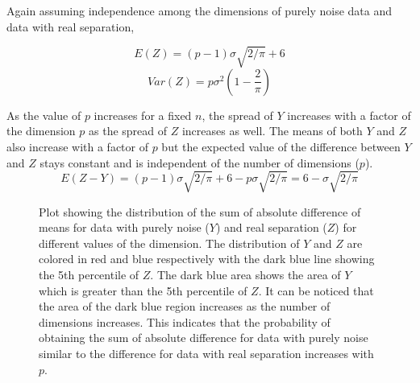 \documentclass[12]{article}
\begin{document}
Again assuming independence among the dimensions of purely noise data and data with real separation,

$$E(Z) = (p - 1) \sigma \sqrt{2/\pi} + 6$$
$$Var(Z) = p \sigma^2 (1 - \frac{2}{\pi})$$

As the value of $p$ increases for a fixed $n$, the spread of $Y$ increases with a factor of the dimension $p$ as the spread of $Z$ increases as well. The means of both $Y$ and $Z$ also increase with a factor of $p$ but the expected value of the difference between $Y$ and $Z$ stays constant and is independent of the number of dimensions ($p$). 
$$E (Z - Y) = (p - 1) \sigma \sqrt{2/\pi} + 6 - p \sigma \sqrt{2/\pi} = 6 - \sigma \sqrt{2/\pi}$$


%
\begin{figure}[hbtp]
   \centering
       \caption{Plot showing the distribution of the sum of absolute difference of means for data with purely noise ($Y$) and real separation ($Z$) for different values of the dimension. The distribution of $Y$ and $Z$ are colored in red and blue respectively with the dark blue line showing the 5th percentile of $Z$. The dark blue area shows the area of $Y$ which is greater than the 5th percentile of $Z$. It can be noticed that the area of the dark blue region  increases as the number of dimensions increases. This indicates that the probability of obtaining the sum of absolute difference for data with purely noise similar to the difference for data with real separation increases with $p$. }
     \label{fig:dimen}
\end{figure}
\end{document}
